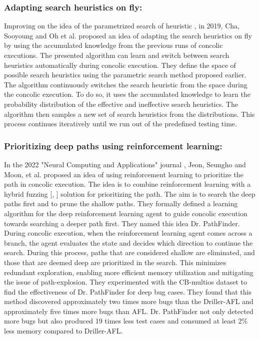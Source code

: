 \documentclass[ runningheads,
               a4paper]{llncs}
\begin{document}
\subsubsection{Adapting search heuristics on fly:}
Improving on the idea of the parametrized search of heuristic \cite{cha2018automatically}, in 2019, Cha, Sooyoung and Oh et al. proposed an idea \cite{adapt2019heuristic} of adapting the search heuristics on fly by using the accumulated knowledge from the previous runs of concolic executions. The presented algorithm can learn and switch between search heuristics automatically during concolic execution. They define the space of possible search heuristics using the parametric search method \cite{adapt2019heuristic} proposed earlier. The algorithm continuously switches the search heuristic from the space during the concolic execution. To do so, it uses the accumulated knowledge to learn the probability distribution of the effective and ineffective search heuristics. The algorithm then samples a new set of search heuristics from the distributions. This process continues iteratively until we run out of the predefined testing time.


\subsubsection{Prioritizing deep paths using reinforcement learning:}
In the 2022 "Neural Computing and Applications" journal \cite{drPathfinder2022}, Jeon, Seungho and Moon, et al. proposed an idea \cite[Dr. PathFinder]{drPathfinder2022} of using reinforcement learning to prioritize the path in concolic execution. The idea is to combine reinforcement learning with a hybrid fuzzing [\cite{miller1990empirical}, \cite{godefroid2012sage}] solution for prioritizing the path. The aim is to search the deep paths first and to prune the shallow paths. They formally defined a learning algorithm for the deep reinforcement learning agent to guide concolic execution towards searching a deeper path first. They named this idea Dr. PathFinder. During concolic execution, when the reinforcement learning agent comes across a branch, the agent evaluates the state and decides which direction to continue the search. During this process, paths that are considered shallow are eliminated, and those that are deemed deep are prioritized in the search. This minimizes redundant exploration, enabling more efficient memory utilization and mitigating the issue of path-explosion. They experimented with the CB-multios dataset to find the effectiveness of Dr. PathFinder for deep bug cases.  They found that this method discovered approximately two times more bugs than the Driller-AFL and approximately five times more bugs than AFL. Dr. PathFinder not only detected more bugs but also produced 19 times less test cases and consumed at least 2\% less memory compared to Driller-AFL.
\end{document}
